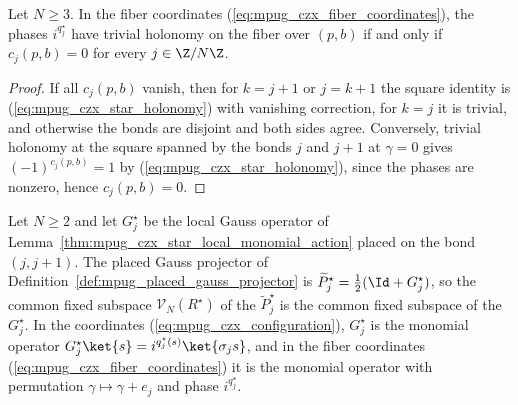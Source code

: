 \begin{lemma}
    \label{thm:mpug_czx_star_good_fibers}
    \leanok
    Let $N\geq3$. In the fiber coordinates
    (\ref{eq:mpug_czx_fiber_coordinates}), the phases $i^{q^\star_j}$ have
    trivial holonomy on the fiber over $(p,b)$ if and only if $c_j(p,b)=0$ for
    every $j\in\Z/N\Z$.
\end{lemma}

\begin{proof}\leanok
    If all $c_j(p,b)$ vanish, then for $k=j+1$ or $j=k+1$ the square identity is
    (\ref{eq:mpug_czx_star_holonomy}) with vanishing correction, for $k=j$ it is
    trivial, and otherwise the bonds are disjoint and both sides agree.
    Conversely, trivial holonomy at the square spanned by the bonds $j$ and
    $j+1$ at $\gamma=0$ gives $(-1)^{c_j(p,b)}=1$ by
    (\ref{eq:mpug_czx_star_holonomy}), since the phases are nonzero, hence
    $c_j(p,b)=0$.
\end{proof}

\begin{lemma}
    \label{thm:mpug_czx_star_placed_operators}
    \leanok
    Let $N\geq2$ and let $G^\star_j$ be the local Gauss operator of
    Lemma~\ref{thm:mpug_czx_star_local_monomial_action} placed on the bond
    $(j,j+1)$. The placed Gauss projector of
    Definition~\ref{def:mpug_placed_gauss_projector} is
    $\widetilde P^\star_j=\tfrac12(\Id+G^\star_j)$, so the common fixed subspace
    $\mathcal V_N(R^\star)$ of the $\widetilde P^\star_j$ is the common fixed
    subspace of the $G^\star_j$. In the coordinates
    (\ref{eq:mpug_czx_configuration}), $G^\star_j$ is the monomial operator
    $G^\star_j\ket{s}=i^{q^\star_j(s)}\ket{\sigma_js}$, and in the fiber
    coordinates (\ref{eq:mpug_czx_fiber_coordinates}) it is the monomial
    operator with permutation $\gamma\mapsto\gamma+e_j$ and phase
    $i^{q^\star_j}$.
\end{lemma}

